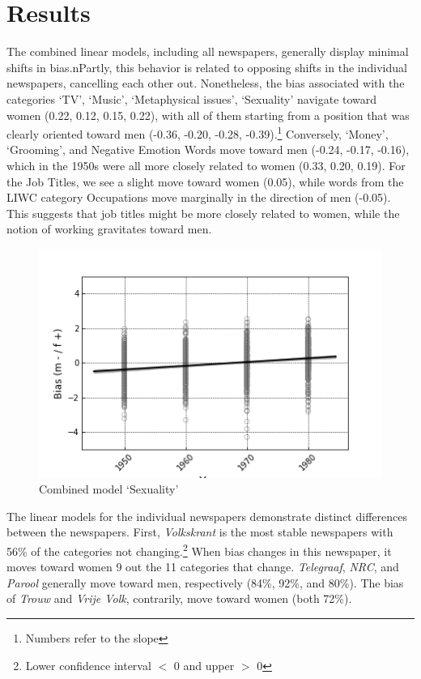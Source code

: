\documentclass[11pt,a4paper]{article}
\begin{document}
\section{Results}
The combined linear models, including all newspapers, generally display minimal shifts in bias.nPartly, this behavior is related to opposing shifts in the individual newspapers, cancelling each other out. Nonetheless, the bias associated with the categories `TV', `Music', `Metaphysical issues', `Sexuality' navigate toward women (0.22, 0.12, 0.15, 0.22), with all of them starting from a position that was clearly oriented toward men (-0.36, -0.20, -0.28, -0.39).\footnote{Numbers refer to the slope} 
Conversely, `Money', `Grooming', and Negative Emotion Words move toward men (-0.24, -0.17, -0.16), which in the 1950s were all more closely related to women (0.33, 0.20, 0.19). For the Job Titles, we see a slight move toward women (0.05), while words from the LIWC category Occupations move marginally in the direction of men (-0.05). This suggests that job titles might be more closely related to women, while the notion of working gravitates toward men. 
\begin{figure}
  \includegraphics[width=\linewidth]{figures/combined_Sexual}
  \caption{Combined model `Sexuality'}
  \label{fig:overall_sexuality}
\end{figure}

The linear models for the individual newspapers demonstrate distinct differences between the newspapers. First, \textit{Volkskrant} is the most stable newspapers with 56\% of the categories not changing.\footnote{Lower confidence interval $<$ 0 and upper $>$ 0} When bias changes in this newspaper, it moves toward women 9 out the 11 categories that change. \textit{Telegraaf}, \textit{NRC}, and \textit{Parool} generally move toward men, respectively (84\%, 92\%, and 80\%). The bias of \textit{Trouw} and \textit{Vrije Volk}, contrarily, move toward women (both 72\%). 
\end{document}
